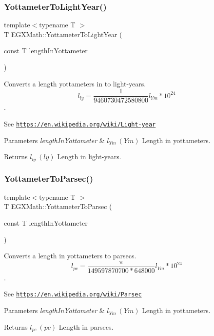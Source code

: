 \subsubsection{\texorpdfstring{Yottameter\+To\+Light\+Year()}{YottameterToLightYear()}}
{\footnotesize\ttfamily template$<$typename T $>$ \\
T E\+G\+X\+Math\+::\+Yottameter\+To\+Light\+Year (\begin{DoxyParamCaption}\item[{const T}]{length\+In\+Yottameter }\end{DoxyParamCaption})}



Converts a length yottameters in to light-\/years. \[ l_{ly}= \frac{1}{9460730472580800} l_{Ym} * 10^{24} \]. 

See \href{https://en.wikipedia.org/wiki/Light-year}{\tt https\+://en.\+wikipedia.\+org/wiki/\+Light-\/year} 
\begin{DoxyParams}{Parameters}
{\em length\+In\+Yottameter} & $ l_{Ym}\ (Ym)$ Length in yottameters. \\
\hline
\end{DoxyParams}
\begin{DoxyReturn}{Returns}
$ l_{ly}\ (ly)$ Length in light-\/years. 
\end{DoxyReturn}
\mbox{\label{group___e_g_x_math-_conversions-_length_conversions-_yottameter-_astronomical_gadcada2ea03efbd6c010a780b87daf01f}} 
\subsubsection{\texorpdfstring{Yottameter\+To\+Parsec()}{YottameterToParsec()}}
{\footnotesize\ttfamily template$<$typename T $>$ \\
T E\+G\+X\+Math\+::\+Yottameter\+To\+Parsec (\begin{DoxyParamCaption}\item[{const T}]{length\+In\+Yottameter }\end{DoxyParamCaption})}



Converts a length in yottameters to parsecs. \[ l_{pc}=\frac{\pi}{149597870700 * 648000} l_{Ym} * 10^{24} \]. 

See \href{https://en.wikipedia.org/wiki/Parsec}{\tt https\+://en.\+wikipedia.\+org/wiki/\+Parsec} 
\begin{DoxyParams}{Parameters}
{\em length\+In\+Yottameter} & $ l_{Ym}\ (Ym)$ Length in yottameters. \\
\hline
\end{DoxyParams}
\begin{DoxyReturn}{Returns}
$ l_{pc}\ (pc)$ Length in parsecs. 
\end{DoxyReturn}

